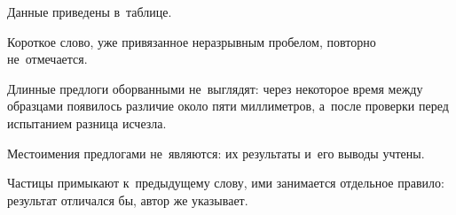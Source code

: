 Данные приведены в~таблице.

Короткое слово, уже привязанное неразрывным пробелом, повторно
не~отмечается.

Длинные предлоги оборванными не~выглядят: через некоторое время между
образцами появилось различие около пяти миллиметров, а~после проверки перед
испытанием разница исчезла.

Местоимения предлогами не~являются: их результаты и~его выводы учтены.

Частицы примыкают к~предыдущему слову, ими занимается отдельное правило:
результат отличался бы, автор же указывает.
